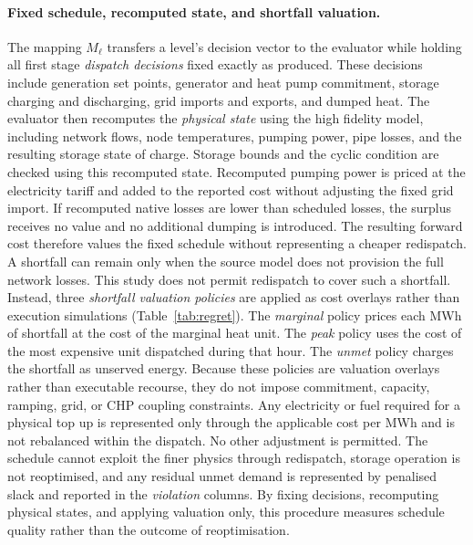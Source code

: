 \documentclass[a4paper,fleqn]{cas-sc}
\newcommand{\new}[1]{\textcolor[HTML]{1A5FB4}{#1}}   %
\newcommand{\new}[1]{#1}
\begin{document}
\paragraph{Fixed schedule, recomputed state, and shortfall valuation.}
The mapping $M_\ell$ transfers a level's decision vector to 
the evaluator while holding all first stage \emph{dispatch decisions} 
fixed exactly as produced. These decisions include generation set points, 
generator and heat pump commitment, storage charging and discharging, grid imports and exports, 
and dumped heat. The evaluator then recomputes the \emph{physical state} using the high fidelity 
model, including network flows, node temperatures, pumping power, pipe losses, and the resulting 
storage state of charge. Storage bounds and the cyclic condition are checked using this recomputed 
state. Recomputed pumping power is priced at the electricity tariff and added to the reported cost 
without adjusting the fixed grid import. If recomputed native losses are lower than scheduled losses,
 the surplus receives no value and no additional dumping is introduced. The resulting forward cost 
 therefore values the fixed schedule without representing a cheaper redispatch. A shortfall can 
 remain only when the source model does not provision the full network losses. This study does 
 not permit redispatch to cover such a shortfall. Instead, three \emph{shortfall valuation policies}
  are applied as cost overlays rather than execution simulations (Table~\ref{tab:regret}). 
  The \emph{marginal} policy prices each MWh of shortfall at the cost of the marginal heat unit. 
  The \emph{peak} policy uses the cost of the most expensive unit dispatched during that hour. 
  The \emph{unmet} policy charges the shortfall as unserved energy. 
  Because these policies are valuation overlays rather than executable recourse, 
  they do not impose commitment, capacity, ramping, grid, or CHP coupling constraints. 
  Any electricity or fuel required for a physical top up is represented only through the 
  applicable cost per MWh and is not rebalanced within the dispatch. No other adjustment 
  is permitted. The schedule cannot exploit the finer physics through redispatch, storage 
  operation is not reoptimised, and any residual unmet demand is represented by penalised 
  slack and reported in the \emph{violation} columns. By fixing decisions, recomputing 
  physical states, and applying valuation only, this procedure measures schedule quality 
  rather than the outcome of reoptimisation.

\new{}
\end{document}
